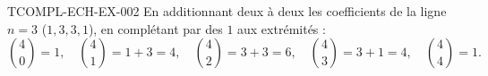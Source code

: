 \begin{corrige}{TCOMPL-ECH-EX-002}
En additionnant deux à deux les coefficients de la ligne $n=3$ ($1,3,3,1$), en complétant par des $1$ aux extrémités :
\[
  \binom{4}{0}=1,\quad \binom{4}{1}=1+3=4,\quad \binom{4}{2}=3+3=6,\quad \binom{4}{3}=3+1=4,\quad \binom{4}{4}=1.
\]
\end{corrige}
